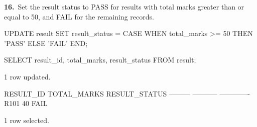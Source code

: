 \noindent\begin{minipage}{\linewidth}
\begingroup{}
{\fontsize{14}{17}\selectfont\textbf{16.}}\ Set the result status to PASS for results with total marks greater than or equal to 50, and FAIL for the remaining records.\par
\endgroup\vspace{12pt}


\begin{sqlcode}
UPDATE result
SET result_status = CASE WHEN total_marks >= 50 THEN 'PASS' ELSE 'FAIL' END;

SELECT result_id, total_marks, result_status FROM result;
\end{sqlcode}

\vspace{18pt}


\begin{sqlout}[fontsize=\small]
1 row updated.

RESULT_ID  TOTAL_MARKS  RESULT_STATUS
---------  -----------  -------------
R101                40  FAIL

1 row selected.
\end{sqlout}
\end{minipage}\par\vspace{24pt}

